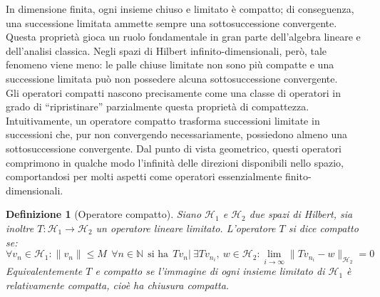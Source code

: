 \documentclass[a4paper,12pt]{report}
\newtheorem{definizione}{Definizione}[chapter]
\begin{document}
In dimensione finita, ogni insieme chiuso e limitato è compatto; di conseguenza, una successione limitata ammette sempre una sottosuccessione convergente. Questa proprietà gioca un ruolo fondamentale in gran parte dell’algebra lineare e dell’analisi classica. Negli spazi di Hilbert infinito-dimensionali, però, tale fenomeno viene meno: le palle chiuse limitate non sono più compatte e una successione limitata può non possedere alcuna sottosuccessione convergente.
\\Gli operatori compatti nascono precisamente come una classe di operatori in grado di “ripristinare” parzialmente questa proprietà di compattezza. Intuitivamente, un operatore compatto trasforma successioni limitate in successioni che, pur non convergendo necessariamente, possiedono almeno una sottosuccessione convergente. Dal punto di vista geometrico, questi operatori comprimono in qualche modo l’infinità delle direzioni disponibili nello spazio, comportandosi per molti aspetti come operatori essenzialmente finito-dimensionali.

\begin{definizione}[Operatore compatto]\label{def: 5.13}
    Siano $\mathscr{H}_1$ e $\mathscr{H}_2$ due spazi di Hilbert, sia inoltre $T:\mathscr{H}_1\to\mathscr{H}_2$ un operatore lineare limitato. L'operatore $T$ si dice compatto se:
    \[\forall v_n\in \mathscr{H}_1: \|v_n\|\leq M \ \ \forall n\in \mathbb{N} \ \ \text{si ha} \ \ Tv_n| \ \exists Tv_{n_i}  ,\  w\in \mathscr{H}_2: \lim_{i\to \infty}\|Tv_{n_i}-w\|_{\mathscr{H}_2}=0\]
    Equivalentemente $T$ e compatto se l'immagine di ogni insieme limitato di $\mathscr{H}_1$ è relativamente compatta, cioè ha chiusura compatta.
\end{definizione}

\newpage
\end{document}
